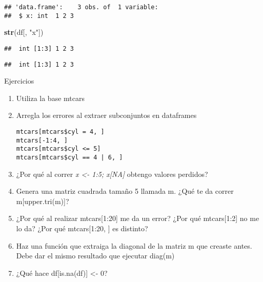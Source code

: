 \documentclass[]{article}
\newenvironment{Shaded}{\begin{snugshade}}{\end{snugshade}}
\newcommand{\KeywordTok}[1]{\textcolor[rgb]{0.13,0.29,0.53}{\textbf{#1}}}
\newcommand{\StringTok}[1]{\textcolor[rgb]{0.31,0.60,0.02}{#1}}
\newcommand{\OperatorTok}[1]{\textcolor[rgb]{0.81,0.36,0.00}{\textbf{#1}}}
\newcommand{\NormalTok}[1]{#1}
\begin{document}
\begin{verbatim}
## 'data.frame':    3 obs. of  1 variable:
##  $ x: int  1 2 3
\end{verbatim}

\begin{Shaded}
\begin{Highlighting}[]
\KeywordTok{str}\NormalTok{(df[, }\StringTok{"x"}\NormalTok{])}
\end{Highlighting}
\end{Shaded}

\begin{verbatim}
##  int [1:3] 1 2 3
\end{verbatim}

\begin{Shaded}
\end{Shaded}

\begin{verbatim}
##  int [1:3] 1 2 3
\end{verbatim}

\renewcommand\bcStyleTitre[1]{\large\textcolor{bbblack}{#1}}

\begin{bclogo}[
  couleur=llred,
  arrondi=0,
  logo=\bcstop,
  barre=none,
  noborder=true]{Ejercicios}
\begin{enumerate}
\item Utiliza la base mtcars
\item{Arregla los errores al extraer subconjuntos en dataframes
\begin{verbatim}
mtcars[mtcars$cyl = 4, ]
mtcars[-1:4, ]
mtcars[mtcars$cyl <= 5]
mtcars[mtcars$cyl == 4 | 6, ]
\end{verbatim}
}
\item ¿Por qué al correr {\it x <- 1:5; x[NA] } obtengo valores perdidos?
\item Genera una matriz cuadrada tamaño 5 llamada m. ¿Qué te da correr m[upper.tri(m)]?
\item ¿Por qué al realizar mtcars[1:20] me da un error? ¿Por qué mtcars[1:2] no me lo da?
¿Por qué mtcars[1:20, ] es distinto?
\item Haz una función que extraiga la diagonal de la matriz m que creaste antes.
Debe dar el mismo resultado que ejecutar diag(m)
\item ¿Qué hace df[is.na(df)] <- 0?
\end{enumerate}
\end{bclogo}
\end{document}
